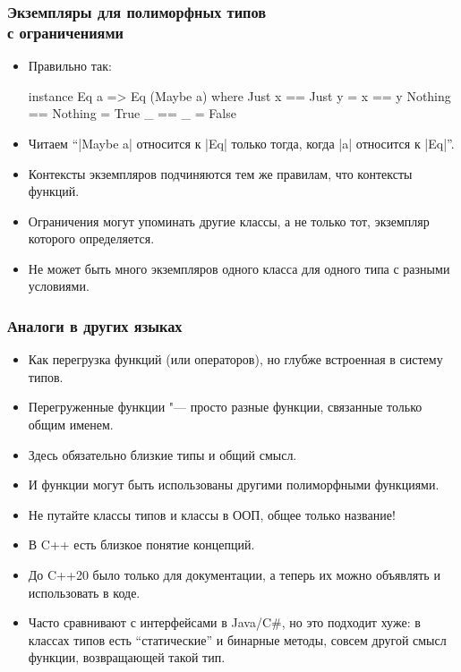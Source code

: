 \documentclass[10pt]{beamer}
\begin{document}
\begin{frame}[fragile]
  \frametitle{Экземпляры для полиморфных типов \\с ограничениями}
  \begin{itemize}
    \item Правильно так:
          \begin{haskell}
            instance Eq a => Eq (Maybe a) where
                Just x == Just y = x == y
                Nothing == Nothing = True
                _ == _ = False
          \end{haskell}
    \item Читаем \enquote{\haskinline|Maybe a| относится к \haskinline|Eq| только тогда, когда \haskinline|a| относится к \haskinline|Eq|}.
    \item Контексты экземпляров подчиняются тем же правилам, что контексты функций.
    \item Ограничения могут упоминать другие классы, а не только тот, экземпляр которого определяется.
    \item Не может быть много экземпляров одного класса для одного типа с разными условиями.
  \end{itemize}
\end{frame}

\begin{frame}[fragile]
  \frametitle{Аналоги в других языках}
  \begin{itemize}
    \item Как перегрузка функций (или операторов), но глубже встроенная в систему типов.
    \item Перегруженные функции "--- просто разные функции, связанные только общим именем.
    \item Здесь обязательно близкие типы и общий смысл.
    \item И функции могут быть использованы другими полиморфными функциями. \pause
    \item Не путайте классы типов и классы в ООП, общее только название!
    \item В C++ есть близкое понятие концепций. \pause
    \item До C++20 было только для документации, а теперь их можно объявлять и использовать в коде. \pause
    \item Часто сравнивают с интерфейсами в Java/C\#, но это подходит хуже: \pause в классах типов есть \enquote{статические} и бинарные методы, совсем другой смысл функции, возвращающей такой тип.
  \end{itemize}
\end{frame}
\end{document}
